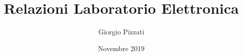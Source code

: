 \documentclass{report}
\title{Relazioni Laboratorio Elettronica}
\author{Giorgio Pizzati}
\date{Novembre 2019}
\begin{document}
\maketitle

\tableofcontents{}







\begin{lstlisting}[language=C, caption=Comunicazione seriale ARM]
	
\end{lstlisting}
\end{document}
